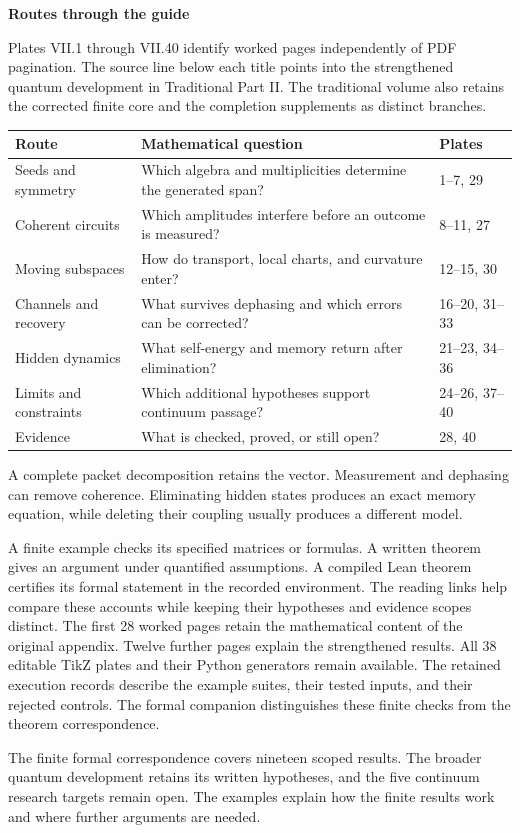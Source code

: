 {\sffamily\bfseries\Large\color{accent}Routes through the guide\par}\vspace{12pt}
Plates VII.1 through VII.40 identify worked pages independently of PDF pagination. The source line below each title points into the strengthened quantum development in Traditional Part II. The traditional volume also retains the corrected finite core and the completion supplements as distinct branches.
\begin{center}\small
\begin{tabularx}{\linewidth}{@{}p{1.5in}Yl@{}}\toprule
Route & Mathematical question & Plates\\\midrule
Seeds and symmetry & Which algebra and multiplicities determine the generated span? & 1--7, 29\\
Coherent circuits & Which amplitudes interfere before an outcome is measured? & 8--11, 27\\
Moving subspaces & How do transport, local charts, and curvature enter? & 12--15, 30\\
Channels and recovery & What survives dephasing and which errors can be corrected? & 16--20, 31--33\\
Hidden dynamics & What self-energy and memory return after elimination? & 21--23, 34--36\\
Limits and constraints & Which additional hypotheses support continuum passage? & 24--26, 37--40\\
Evidence & What is checked, proved, or still open? & 28, 40\\\bottomrule
\end{tabularx}
\end{center}
A complete packet decomposition retains the vector. Measurement and dephasing can remove coherence. Eliminating hidden states produces an exact memory equation, while deleting their coupling usually produces a different model.

A finite example checks its specified matrices or formulas. A written theorem gives an argument under quantified assumptions. A compiled Lean theorem certifies its formal statement in the recorded environment. The reading links help compare these accounts while keeping their hypotheses and evidence scopes distinct.
The first 28 worked pages retain the mathematical content of the original appendix. Twelve further pages explain the strengthened results. All 38 editable TikZ plates and their Python generators remain available. The retained execution records describe the example suites, their tested inputs, and their rejected controls. The formal companion distinguishes these finite checks from the theorem correspondence.

The finite formal correspondence covers nineteen scoped results. The broader quantum development retains its written hypotheses, and the five continuum research targets remain open. The examples explain how the finite results work and where further arguments are needed.
